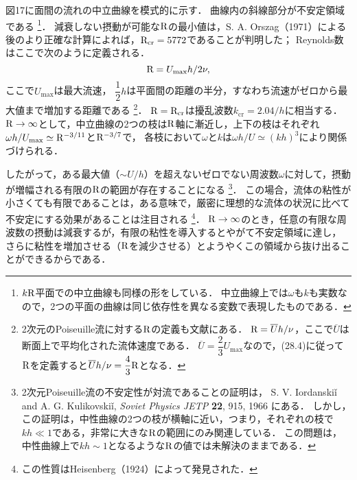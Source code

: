 図17に面間の流れの中立曲線を模式的に示す．
曲線内の斜線部分が不安定領域である
\footnote{
$k\mathrm{R}$平面での中立曲線も同様の形をしている．
中立曲線上では$\omega$も$k$も実数なので，2つの平面の曲線は同じ依存性を異なる変数で表現したものである．}．
減衰しない摂動が可能な$\mathrm{R}$の最小値は，S. A. Orszag（1971）による後のより正確な計算によれば，$\mathrm{R}_{\mathrm{cr}}=5772$であることが判明した；
Reynolds数はここで次のように定義される．
\begin{equation}
    \mathrm{R} = U_\mathrm{max} h/2\nu,
\end{equation}
ここで$U_\mathrm{max}$は最大流速，
$\dfrac{1}{2}h$は平面間の距離の半分，すなわち流速がゼロから最大値まで増加する距離である
\footnote{2次元のPoiseuille流に対する$\mathrm{R}$の定義も文献にある．
$\mathrm{R}=\overline{U}h/\nu$，ここで$\overline{U}$は断面上で平均化された流体速度である．
$\overline{U}=\dfrac{2}{3}U_\mathrm{max}$なので，(28.4)に従って$\mathrm{R}$を定義すると$\overline{U}h/\nu = \dfrac{4}{3}\mathrm{R}$となる．}．
$\mathrm{R}=\mathrm{R}_{\mathrm{cr}}$は擾乱波数$k_\mathrm{cr}=2.04/h$に相当する．
$\mathrm{R}\to\infty$として，中立曲線の2つの枝は$\mathrm{R}$軸に漸近し，上下の枝はそれぞれ$\omega h/U_\mathrm{max} \simeq \mathrm{R}^{-3/11}$と$\mathrm{R}^{-3/7}$で，
各枝において$\omega$と$k$は$\omega h/U \simeq (kh)^3$により関係づけられる．




したがって，ある最大値（$\sim U/h$）を超えないゼロでない周波数$\omega$に対して，摂動が増幅される有限の$\mathrm{R}$の範囲が存在することになる
\footnote{
2次元Poiseuille流の不安定性が対流であることの証明は，
S. V. Iordanski\v{i} and A. G. Kulikovski\v{i}, \textit{Soviet Physics JETP} \textbf{22}, 915, 1966
にある．
しかし，この証明は，中性曲線の2つの枝が横軸に近い，つまり，それぞれの枝で$kh \ll 1$である，非常に大きな$\mathrm{R}$の範囲にのみ関連している．
この問題は，中性曲線上で$kh \sim 1$となるような$\mathrm{R}$の値では未解決のままである．}．
この場合，流体の粘性が小さくても有限であることは，ある意味で，厳密に理想的な流体の状況に比べて不安定にする効果があることは注目される
\footnote{この性質はHeisenberg（1924）によって発見された．}．
$\mathrm{R}\to\infty$のとき，任意の有限な周波数の摂動は減衰するが，有限の粘性を導入するとやがて不安定領域に達し，
さらに粘性を増加させる（$\mathrm{R}$を減少させる）とようやくこの領域から抜け出ることができるからである．






